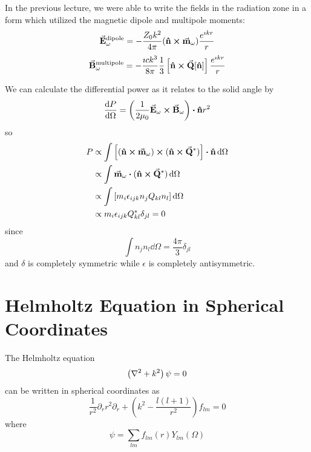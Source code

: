 \documentclass[a4paper,twoside,master.tex]{subfiles}
\begin{document}

In the previous lecture, we were able to write the fields in the radiation zone in a form which utilized the magnetic dipole and multipole moments:
\begin{equation}
    \va{E}_{\omega}^{\text{dipole}} = - \frac{Z_0 k^2}{4 \pi} ( \vu{n} \cross \va{m}_{\omega}) \frac{e^{\imath kr}}{r}
\end{equation}
\begin{equation}
    \va{B}_{\omega}^{\text{multipole}} = - \frac{\imath c k^3}{8 \pi} \frac{1}{3} \left[ \vu{n} \cross \va{Q} [ \vu{n}] \right] \frac{e^{\imath kr}}{r}
\end{equation}

We can calculate the differential power as it relates to the solid angle by
\begin{equation}
    \dv{P}{\Omega} = \left( \frac{1}{2 \mu_0} \va{E}_{\omega} \cross \va{B}_{\omega} \right) \vdot \vu{n} r^2
\end{equation}
so
\begin{align}
    P &\propto \int \left[ ( \vu{n} \cross \va{m}_{\omega}) \cross ( \vu{n} \cross \va{Q}^*) \right] \vdot \vu{n} \dd{\Omega} \\
    &\propto \int \va{m}_{\omega} \vdot ( \vu{n} \cross \va{Q}^*) \dd{\Omega} \\
    &\propto \int \left[ m_i \epsilon_{ijk} n_j Q_{kl} n_l \right] \dd{\Omega} \\
    &\propto m_i \epsilon_{ijk} Q^*_{kl} \delta_{jl} = 0
\end{align}
since
\begin{equation}
    \int n_j n_l \dd{\Omega} = \frac{4 \pi}{3} \delta_{jl}
\end{equation}
and $ \delta $ is completely symmetric while $ \epsilon $ is completely antisymmetric.

\section{Helmholtz Equation in Spherical Coordinates}
\label{sec:helmholtz_equation_in_spherical_coordinates}

The Helmholtz equation
\begin{equation}
    \left( \laplacian + k^2 \right) \psi = 0
\end{equation}
can be written in spherical coordinates as
\begin{equation}
    \frac{1}{r^2} \partial_r r^2 \partial_r + \left( k^2 - \frac{l(l+1)}{r^2} \right) f_{lm} = 0
\end{equation}
where
\begin{equation}
    \psi = \sum_{lm} f_{lm}(r) Y_{lm}(\Omega)
\end{equation}
\end{document}
